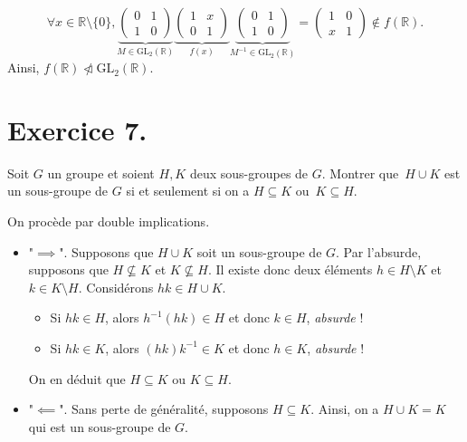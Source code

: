 \documentclass[./main]{subfiles}
\begin{document}
\begin{enumerate}
\[      \forall x \in \mathds{R} \setminus \{0\},
      \underbrace{\begin{pmatrix} 0 & 1\\ 1 & 0 \end{pmatrix}}_{M \in \mathrm{GL}_2(\mathds{R})}
      \underbrace{\begin{pmatrix} 1 & x\\ 0 & 1 \end{pmatrix}}_{f(x)}
      \underbrace{\begin{pmatrix} 0 & 1\\ 1 & 0 \end{pmatrix}}_{M^{-1} \in \mathrm{GL}_2(\mathds{R})}
      = \begin{pmatrix} 1 & 0\\ x & 1 \end{pmatrix} \not\in f(\mathds{R})
      .\]
      Ainsi, $f(\mathds{R}) \ntriangleleft \mathrm{GL}_2(\mathds{R})$.
  \end{enumerate}

  \section{Exercice 7.}
  \begin{enonce}
    Soit $G$ un groupe et soient $H, K$ deux sous-groupes de $G$.
    Montrer que~$H \cup K$ est un sous-groupe de $G$ si et seulement si on a $H \subseteq K$ ou~$K \subseteq H$.
  \end{enonce}

  On procède par double implications.
  \begin{itemize}
    \item "$\implies$".
      Supposons que $H \cup K$ soit un sous-groupe de $G$.
      Par l'absurde, supposons que $H \not\subseteq K$ et $K \not\subseteq H$.
      Il existe donc deux éléments $h \in H \setminus K$ et~$k \in K \setminus H$.
      Considérons $hk \in H \cup K$.
      \begin{itemize}
        \item Si $hk \in H$, alors $h^{-1}(hk) \in H$ et donc $k \in H$, \textit{absurde} !
        \item Si $hk \in K$, alors $(hk)k^{-1} \in K$ et donc $h \in K$, \textit{absurde} !
      \end{itemize}
      On en déduit que $H \subseteq K$ ou $K \subseteq H$.
    \item "$\impliedby$".
      Sans perte de généralité, supposons $H \subseteq K$.
      Ainsi, on a $H \cup K = K$ qui est un sous-groupe de $G$.
  \end{itemize}
\end{document}
